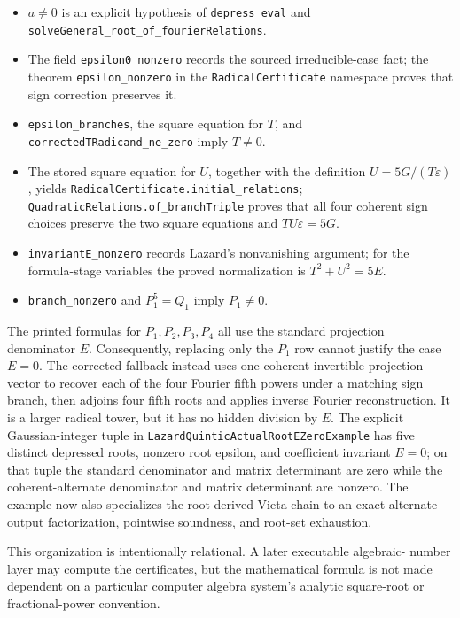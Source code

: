 \documentclass[11pt,a4paper,oneside]{article}
\newcommand{\lean}[1]{\nolinkurl{#1}}
\newcommand{\eps}{\varepsilon}
\begin{document}
\begin{itemize}
\item $a\ne0$ is an explicit hypothesis of \lean{depress_eval} and
  \lean{solveGeneral_root_of_fourierRelations}.
\item The field \lean{epsilon0_nonzero} records the sourced irreducible-case
  fact; the theorem \lean{epsilon_nonzero} in the
  \lean{RadicalCertificate} namespace proves that sign correction preserves it.
\item \lean{epsilon_branches}, the square equation for $T$, and
  \lean{correctedTRadicand_ne_zero} imply $T\ne0$.
\item The stored square equation for $U$, together with the definition
  $U=5G/(T\eps)$, yields \lean{RadicalCertificate.initial_relations};
  \lean{QuadraticRelations.of_branchTriple} proves that all four coherent
  sign choices preserve the two square equations and $TU\eps=5G$.
\item \lean{invariantE_nonzero} records Lazard's nonvanishing argument; for
  the formula-stage variables the proved normalization is
  $T^2+U^2=5E$.
\item \lean{branch_nonzero} and $P_1^5=Q_1$ imply $P_1\ne0$.
\end{itemize}

The printed formulas for $P_1,P_2,P_3,P_4$ all use the standard projection
denominator $E$.  Consequently, replacing only the $P_1$ row cannot justify
the case $E=0$.  The corrected fallback instead uses one coherent invertible
projection vector to recover each of the four Fourier fifth powers under a
matching sign branch, then adjoins four fifth roots and applies inverse
Fourier reconstruction.  It is a larger radical tower, but it has no hidden
division by $E$.  The explicit Gaussian-integer tuple in
\lean{LazardQuinticActualRootEZeroExample} has five distinct depressed
roots, nonzero root epsilon, and coefficient invariant $E=0$; on that tuple
the standard denominator and matrix determinant are zero while the
coherent-alternate denominator and matrix determinant are nonzero.  The
example now also specializes the root-derived Vieta chain
to an exact alternate-output factorization, pointwise soundness, and
root-set exhaustion.

This organization is intentionally relational.  A later executable algebraic-
number layer may compute the certificates, but the mathematical formula is not
made dependent on a particular computer algebra system's analytic square-root
or fractional-power convention.
\end{document}
